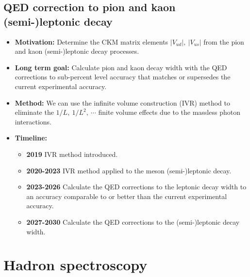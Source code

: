 \documentclass[12pt,hyperpdf]{article}
\begin{document}
\subsection{QED correction to pion and kaon (semi-)leptonic decay}
\begin{itemize}
    \item{\bf Motivation:} Determine the CKM matrix elements $|V_{ud}|,~|V_{us}|$ from the pion and kaon (semi-)leptonic decay processes.
    \item{\bf Long term goal:} Calculate pion and kaon decay width with the QED corrections to sub-percent level accuracy that matches or supersedes the current experimental accuracy.
    \item{\bf Method:}
      We can use the infinite volume construction (IVR) method \cite{Christ:2023lcc} to eliminate
      the $1/L,~1/L^2,~\cdots$ finite volume effects due to the massless photon interactions.
\item{\bf Timeline:}
\begin{itemize}
    \item{\bf 2019} IVR method introduced.
    \item{\bf 2020-2023} IVR method applied to the meson (semi-)leptonic decay.
    \item{\bf 2023-2026} Calculate the QED corrections to the leptonic decay width to an accuracy comparable to or better than the current experimental accuracy.
    \item{\bf 2027-2030} Calculate the QED corrections to the (semi-)leptonic decay width.
\end{itemize}
\end{itemize}
\section{Hadron spectroscopy}\label{sec:hadspec}

\end{document}
